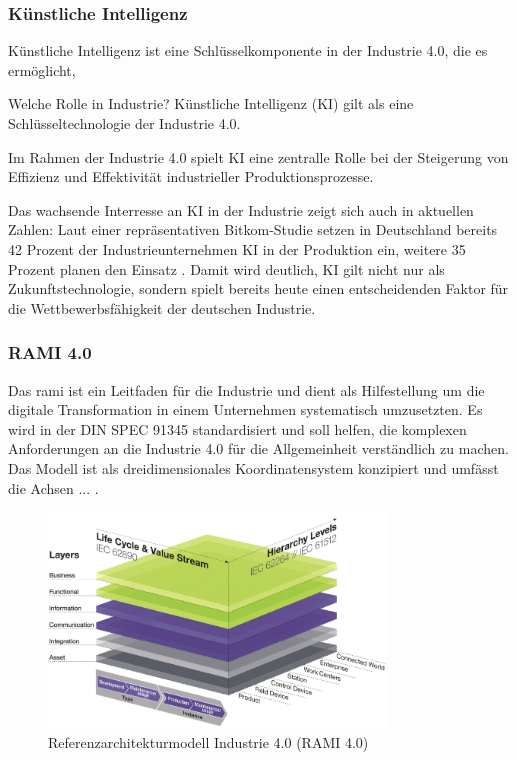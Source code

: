 \subsubsection{Künstliche Intelligenz}
Künstliche Intelligenz ist eine Schlüsselkomponente in der Industrie 4.0, die es ermöglicht, 

Welche Rolle in Industrie?
Künstliche Intelligenz (KI) gilt als eine Schlüsseltechnologie der Industrie 4.0.

Im Rahmen der Industrie 4.0 spielt KI eine zentralle Rolle bei der Steigerung von Effizienz und Effektivität industrieller Produktionsprozesse.

Das wachsende Interresse  an KI in der Industrie zeigt sich auch in aktuellen Zahlen: Laut einer repräsentativen Bitkom-Studie setzen in Deutschland bereits 42 Prozent der Industrieunternehmen KI in der Produktion ein, weitere 35 Prozent planen den Einsatz \cite{bitkomStudie}.
Damit wird deutlich, KI gilt nicht nur als Zukunftstechnologie, sondern spielt bereits heute einen entscheidenden Faktor für die Wettbewerbsfähigkeit der deutschen Industrie.
 


\subsubsection{RAMI 4.0}
Das \ac{rami} ist ein Leitfaden für die Industrie und dient als Hilfestellung um die digitale Transformation in einem Unternehmen systematisch umzusetzten.
Es wird in der DIN SPEC 91345 \cite{RAMI4.0} standardisiert und soll helfen, die komplexen Anforderungen an die Industrie 4.0 für die Allgemeinheit verständlich zu machen.
Das Modell ist als dreidimensionales Koordinatensystem konzipiert und umfässt die Achsen ... .


\begin{figure}[htbp]
    \centering
    \includegraphics[width=0.8\textwidth]{Bilder/RAMI.PNG}
    \caption{Referenzarchitekturmodell Industrie 4.0 (RAMI 4.0)}
    \label{fig:klassifizierungDT}
\end{figure}

